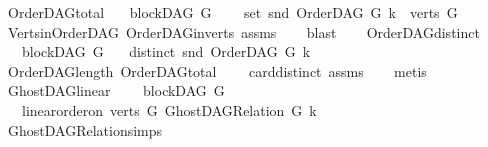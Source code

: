 \begin{isabellebody}
\isanewline
%
\endisadelimproof
\isanewline
{}\isamarkupfalse%
\ OrderDAG{\isacharunderscore}{\kern0pt}total{\isacharcolon}{\kern0pt}\isanewline
\ \ \ {\isachardoublequoteopen}blockDAG\ G{\isachardoublequoteclose}\ \isanewline
\ \ \ {\isachardoublequoteopen}set\ {\isacharparenleft}{\kern0pt}snd\ {\isacharparenleft}{\kern0pt}OrderDAG\ G\ k{\isacharparenright}{\kern0pt}{\isacharparenright}{\kern0pt}\ {\isacharequal}{\kern0pt}\ verts\ G{\isachardoublequoteclose}\isanewline
%
\isadelimproof
\ \ %
\endisadelimproof
%
\isatagproof
{}\isamarkupfalse%
\ Verts{\isacharunderscore}{\kern0pt}in{\isacharunderscore}{\kern0pt}OrderDAG\ OrderDAG{\isacharunderscore}{\kern0pt}in{\isacharunderscore}{\kern0pt}verts\ assms{\isacharparenleft}{\kern0pt}{}{\isacharparenright}{\kern0pt}\isanewline
\ \ \isamarkupfalse%
\ blast%
\endisatagproof
{\isafoldproof}%
%
\isadelimproof
\ \isanewline
%
\endisadelimproof
\isanewline
{}\isamarkupfalse%
\ \ OrderDAG{\isacharunderscore}{\kern0pt}distinct{\isacharcolon}{\kern0pt}\isanewline
\ \ \ {\isachardoublequoteopen}blockDAG\ G{\isachardoublequoteclose}\isanewline
\ \ \ {\isachardoublequoteopen}distinct\ {\isacharparenleft}{\kern0pt}snd\ {\isacharparenleft}{\kern0pt}OrderDAG\ G\ k{\isacharparenright}{\kern0pt}{\isacharparenright}{\kern0pt}{\isachardoublequoteclose}\isanewline
%
\isadelimproof
\ \ %
\endisadelimproof
%
\isatagproof
{}\isamarkupfalse%
\ OrderDAG{\isacharunderscore}{\kern0pt}length\ OrderDAG{\isacharunderscore}{\kern0pt}total\isanewline
\ \ \ \ card{\isacharunderscore}{\kern0pt}distinct\ assms\isanewline
\ \ \isamarkupfalse%
\ metis%
\endisatagproof
{\isafoldproof}%
%
\isadelimproof
\ \isanewline
%
\endisadelimproof
\isanewline
\isanewline
{}\isamarkupfalse%
\ GhostDAG{\isacharunderscore}{\kern0pt}linear{\isacharcolon}{\kern0pt}\ \isanewline
\ \ \ {\isachardoublequoteopen}blockDAG\ G{\isachardoublequoteclose}\ \isanewline
\ \ \ {\isachardoublequoteopen}linear{\isacharunderscore}{\kern0pt}order{\isacharunderscore}{\kern0pt}on\ {\isacharparenleft}{\kern0pt}verts\ G{\isacharparenright}{\kern0pt}\ {\isacharparenleft}{\kern0pt}GhostDAG{\isacharunderscore}{\kern0pt}Relation\ G\ k{\isacharparenright}{\kern0pt}{\isachardoublequoteclose}\isanewline
%
\isadelimproof
\ \ %
\endisadelimproof
%
\isatagproof
{}\isamarkupfalse%
\ GhostDAG{\isacharunderscore}{\kern0pt}Relation{\isachardot}{\kern0pt}simps\ \isanewline

\end{isabellebody}
